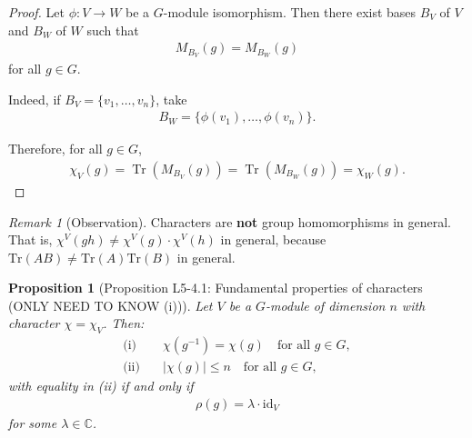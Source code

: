 \documentclass[titlepage]{article}
\theoremstyle{plain}
\newtheorem{proposition}[theorem]{Proposition}
\theoremstyle{definition}
\theoremstyle{remark}
\newtheorem{remark}{Remark}[section]
\theoremstyle{exercise-style}
\numberwithin{equation}{section}
\numberwithin{theorem}{section}
\numberwithin{remark}{section}
\begin{document}
\begin{proof}
    Let $\phi : V \to W$ be a $G$-module isomorphism. Then there exist bases $B_V$ of $V$ and $B_W$ of $W$ such that
    \begin{align}
        M_{B_V}(g) = M_{B_W}(g)
    \end{align}
    for all $g \in G$.
    
    Indeed, if $B_V = \{v_1,\dots,v_n\}$, take
    \begin{align}
        B_W = \{\phi(v_1),\dots,\phi(v_n)\}.
    \end{align}
    
    Therefore, for all $g \in G$,
    \begin{align}
        \chi_V(g) = \operatorname{Tr}(M_{B_V}(g)) = \operatorname{Tr}(M_{B_W}(g)) = \chi_W(g).
    \end{align}
\end{proof}

\begin{remark}[Observation]
    Characters are \textbf{not} group homomorphisms in general. That is, $\chi^V(gh) \neq \chi^V(g) \cdot \chi^V(h)$ in general, because $\mathrm{Tr}(AB) \neq \mathrm{Tr}(A)\mathrm{Tr}(B)$ in general.
\end{remark}

\begin{myboxg}
    \begin{proposition}[Proposition L5-4.1: Fundamental properties of characters (ONLY NEED TO KNOW (i))]
        Let $V$ be a $G$-module of dimension $n$ with character $\chi = \chi_V$. Then:
        \begin{align}
            \text{(i)} \quad & \chi(g^{-1}) = \chi(g) \quad \text{for all } g \in G, \\
            \text{(ii)} \quad & |\chi(g)| \le n \quad \text{for all } g \in G,
        \end{align}
        with equality in (ii) if and only if
        \begin{align}
            \rho(g) = \lambda \cdot \mathrm{id}_V
        \end{align}
        for some $\lambda \in \mathbb{C}$.
    \end{proposition}
\end{myboxg}
\end{document}
